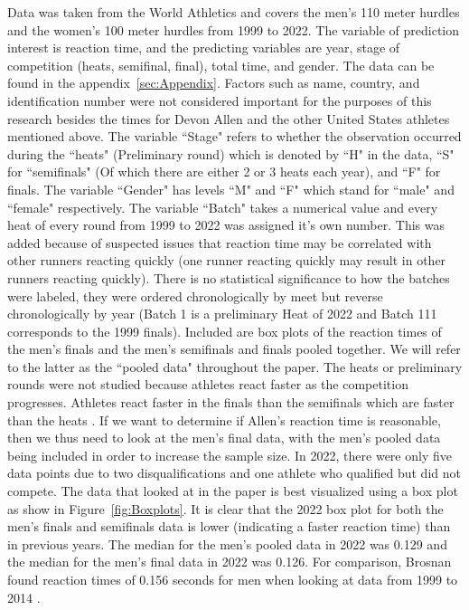 \documentclass[12pt, letterpaper, titlepage]{article}
\begin{document}
Data was taken from the World Athletics and covers the men's 110 meter hurdles 
and the women's 100 meter hurdles from 1999 to 2022.  The variable of prediction 
interest is reaction time, and the predicting variables are year, stage of 
competition (heats, semifinal, final), total time, and gender.  
The data can be found in the appendix~\ref{sec:Appendix}. Factors such as name, 
country, and identification number were not considered important for the 
purposes of this research besides the times for Devon Allen and the other 
United States athletes mentioned above.  The variable ``Stage"
refers to whether the observation occurred during the ``heats" (Preliminary round) which
is denoted by ``H" in the data, ``S" for ``semifinals" (Of which there are either 2 or 3 
heats each year), and ``F" for finals. The variable ``Gender" has levels ``M" and ``F" 
which stand for ``male" and ``female" respectively.  The variable ``Batch" takes a 
numerical value and every heat of every round from 1999 to 2022 was assigned it's
own number.  This was added because of suspected issues that reaction time may be
correlated with other runners reacting quickly (one runner reacting quickly may
result in other runners reacting quickly).  There is no statistical significance to
how the batches were labeled, they were ordered chronologically by meet but
reverse chronologically by year (Batch 1 is a preliminary Heat of 2022 and Batch
111 corresponds to the 1999 finals). Included are
box plots of the reaction times of the men's finals and the men's semifinals and
finals pooled together.  We will refer to the latter as the ``pooled data"
throughout the paper.  The heats or preliminary rounds were not studied because
athletes react faster as the competition progresses.  Athletes react faster in
the finals than the semifinals which are faster than the heats 
\citep{zhang2021correlation}.  If we want to determine if Allen's reaction time
is reasonable, then we thus need to look at the men's final data, with the men's
pooled data being included in order to increase the sample size.  In 2022, there
were only five data points due to two disqualifications and one athlete who 
qualified but did not compete.
The data that looked at in the paper is best visualized using a box plot as show 
in Figure~\ref{fig:Boxplots}.  It is clear that the 2022 box plot for both the
men's finals and semifinals data is lower (indicating a faster reaction time)
than in previous years.  The median for the men's pooled data in 2022 was 0.129
and the median for the men's final data in 2022 was 0.126.  For comparison,
Brosnan found reaction times of 0.156 seconds for men when looking at data from
1999 to 2014 \citep{brosnan2017effects}.
\end{document}
